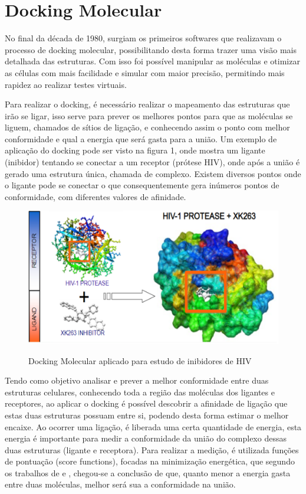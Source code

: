 \documentclass[tcc, capa]{texucpel}
\begin{document}
\section{Docking Molecular}
No final da década de 1980, surgiam os primeiros softwares que realizavam o processo de docking molecular, possibilitando desta forma trazer uma visão mais detalhada das estruturas. Com isso foi possível manipular as moléculas e otimizar as células com mais facilidade e simular com maior precisão, permitindo mais rapidez ao realizar testes virtuais.

Para realizar o docking, é necessário realizar o mapeamento das estruturas que irão se ligar, isso serve para prever os melhores pontos para que as moléculas se liguem, chamados de sítios de ligação, e conhecendo assim o ponto com melhor conformidade e qual a energia que será gasta para a união. Um exemplo de aplicação do docking pode ser visto na figura 1, onde mostra um ligante (inibidor) tentando se conectar a um receptor (prótese HIV), onde após a união é gerado uma estrutura única, chamada de complexo. Existem diversos pontos onde o ligante pode se conectar o que consequentemente gera inúmeros pontos de conformidade, com diferentes valores de afinidade.

      \begin{figure}[!htb]
      \centering
      \includegraphics[width=13cm]{imagens/exemplo_docking.png}   
      \caption{Docking Molecular aplicado para estudo de inibidores de HIV}
    \cite{imagemDocking}
	\end{figure}
    \FloatBarrier
    
    
Tendo como objetivo analisar e prever a melhor conformidade entre duas estruturas celulares, conhecendo toda a região das moléculas dos ligantes e receptores, ao aplicar o docking é possível descobrir a afinidade de ligação que estas duas estruturas possuam entre si, podendo desta forma estimar o melhor encaixe.
Ao ocorrer uma ligação, é liberada uma certa quantidade de energia, esta energia é importante para medir a conformidade da união do complexo dessas duas estruturas (ligante e receptora).
Para realizar a medição, é utilizada funções de pontuação (score functions), focadas na minimização energética, que  segundo os trabalhos de\cite{lybrand1995ligand} e \cite{kitchen2004docking} , chegou-se a conclusão de que, quanto menor a energia gasta entre duas moléculas, melhor será sua a conformidade na união. 
\end{document}
